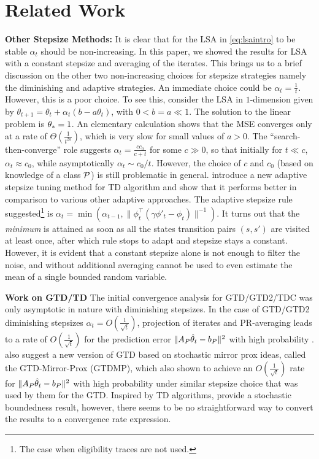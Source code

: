 \section{Related Work}\label{sec:related}
\textbf{Other Stepsize Methods:} 
It is clear that for the LSA in \eqref{eq:lsaintro} to be stable $\alpha_t$ should be non-increasing. In this paper, we showed the results for LSA with a constant stepsize and averaging of the iterates.  This brings us to a brief discussion on the other two non-increasing choices for stepsize strategies namely the diminishing and adaptive strategies.
An immediate choice could be $\alpha_t=\frac{1}{t}$.
However, this is a poor choice. 
To see this, consider the LSA in $1$-dimension given by $\theta_{t+1}=\theta_t+\alpha_t(b-a\theta_t)$, with $0<b=a\ll 1$. The solution to the linear  problem is $\theta_*=1$.
An elementary calculation shows that the MSE converges only at a rate of $\Theta(\frac{1}{t^{2a}})$, which is very slow for small values of $a>0$. The ``search-then-converge'' role suggests 
$\alpha_t=\frac{cc_0}{c+t}$ for some $c\gg 0$, so that initially for $t \ll c$, $\alpha_t \approx c_0$, while asymptotically $\alpha_t \sim c_0/t$. 
However, the choice of $c$ and $c_0$ (based on knowledge of a class $\mathcal{P}$) is still problematic in general.
\citet{dab} introduce a new adaptive stepsize tuning method for TD algorithm and show that it performs better in comparison to various other adaptive approaches. The adaptive stepsize rule suggested\footnote{The case when eligibility traces are not used.} is $\alpha_t=\min(\alpha_{t-1},\parallel\phi^\top_t(\gamma\phi'_t-\phi_t)\parallel^{-1})$. It turns out that the \emph{minimum} is attained as soon as all the states transition pairs $(s,s')$ are visited at least once, after which rule stops to adapt and stepsize stays a constant. However, it is evident that a constant stepsize alone is not enough to filter the noise, and without additional averaging cannot be used to even estimate the mean of a single bounded random variable. 

\textbf{Work on GTD/TD} The initial convergence analysis for GTD/GTD2/TDC was only asymptotic in nature \cite{gtd,gtd2} with diminishing stepsizes.
In the case of GTD/GTD2 diminishing stepsizes $\alpha_t=O(\frac{1}{\sqrt{t}})$, projection of iterates and PR-averaging leads to a rate of $O(\frac{1}{\sqrt{t}})$ 
for the prediction error $\| A_P\hat{\theta}_t-b_P\|^2$ with high probability \cite{gtdmp}. 
\citet{gtdmp} also suggest a new version of GTD based on stochastic mirror prox ideas, called the GTD-Mirror-Prox (GTDMP), 
which also shown to achieve an $O(\frac{1}{\sqrt{t}})$ rate for $\| A_P\hat{\theta}_t-b_P\|^2$ with high probability under similar stepsize choice that was used by them for the GTD. Inspired by TD algorithms, \citet{dalal} provide a stochastic boundedness result, however, there seems to be no straightforward way to convert the results to a convergence rate expression.

